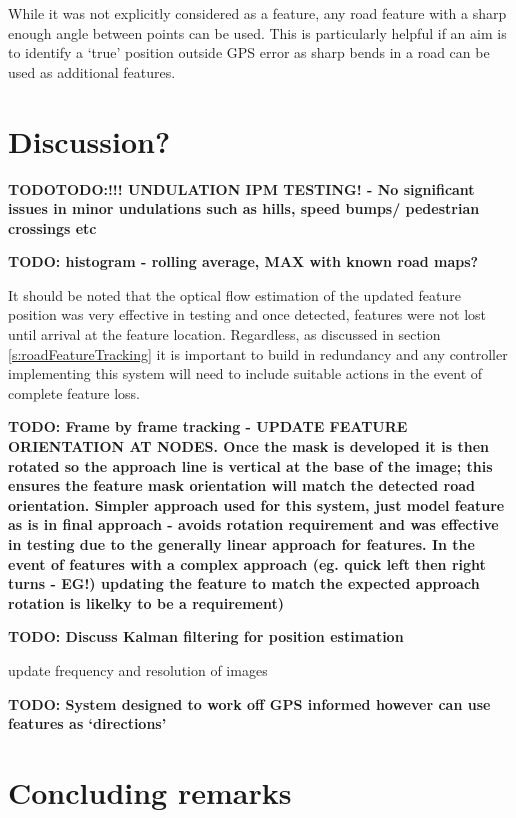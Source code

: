 \documentclass[]{aiaa-tc}%
\begin{document}
While it was not explicitly considered as a feature, any road feature with a sharp enough angle between points can be used. This is particularly helpful if an aim is to identify a `true' position outside GPS error as sharp bends in a road can be used as additional features.

\section{ Discussion?}

\textbf{TODOTODO:!!! UNDULATION IPM TESTING! - No significant issues in minor undulations such as hills, speed bumps/ pedestrian crossings etc}


\textbf{TODO: histogram - rolling average, MAX with known road maps?}


It should be noted that the optical flow estimation of the updated feature position was very effective in testing and once detected, features were not lost until arrival at the feature location. Regardless, as discussed in section \ref{s:roadFeatureTracking} it is important to build in redundancy and any controller implementing this system will need to include suitable actions in the event of complete feature loss.

\textbf{TODO: Frame by frame tracking - UPDATE FEATURE ORIENTATION AT NODES. Once the mask is developed it is then rotated so the approach line is vertical at the base of the image; this ensures the feature mask orientation will match the detected road orientation. Simpler approach used for this system, just model feature as is in final approach - avoids rotation requirement and was effective in testing due to the generally linear approach for features. In the event of features with a complex approach (eg. quick left then right turns - EG!) updating the feature to match the expected approach rotation is likelky to be a requirement)}

\textbf{TODO: Discuss Kalman filtering for position estimation}

update frequency and resolution of images

\textbf{TODO: System designed to work off GPS informed however can use features as `directions'}

\section{Concluding remarks}
\end{document}

